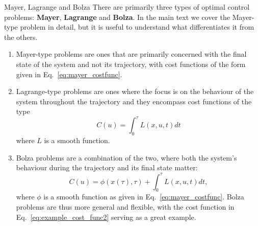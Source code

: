 \begin{mycolorbox}{{Mayer, Lagrange and Bolza}}
    There are primarily three types of optimal control problems: \textbf{Mayer}, \textbf{Lagrange} and \textbf{Bolza}. In the main text we cover the Mayer-type problem in detail, but it is useful to understand what differentiates it from the others.
    \begin{enumerate}
        \item Mayer-type problems are ones that are primarily concerned with the final state of the system and not its trajectory, with cost functions of the form given in Eq.~\eqref{eq:mayer_costfunc}.
        \item Lagrange-type problems are ones where the focus is on the behaviour of the system throughout the trajectory and they encompass cost functions of the type
        \begin{equation}
            C(u) = \int_0^{\tau} L(x, u, t) dt
        \end{equation}
        where $L$ is a smooth function. 
        \item Bolza problems are a combination of the two, where both the system's behaviour during the trajectory and its final state matter:
        \begin{equation}
            C(u) = \phi(x(\tau), \tau) + \int_0^{\tau} L(x, u, t) dt,
        \end{equation}
        where $\phi$ is a smooth function as given in Eq.~\eqref{eq:mayer_costfunc}. Bolza problems are thus more general and flexible, with the cost function in Eq.~\eqref{eq:example_cost_func2} serving as a great example.
    \end{enumerate}
\end{mycolorbox}

